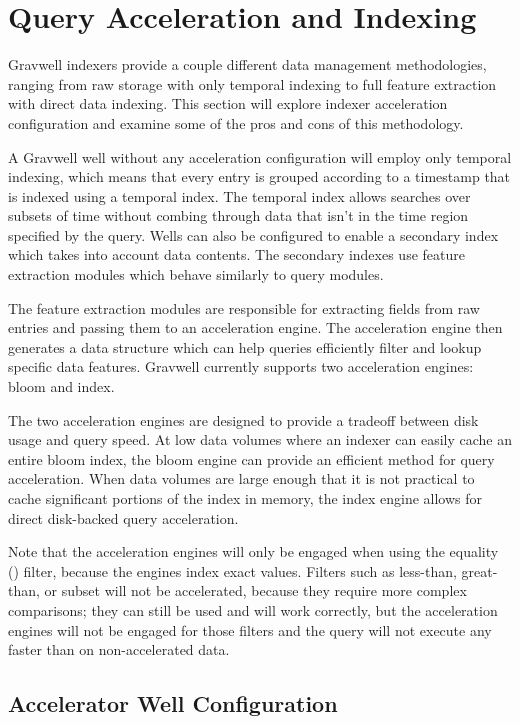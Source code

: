 {\section{Query Acceleration and Indexing}
\label{sec:acceleration}
Gravwell indexers provide a couple different data management
methodologies, ranging from raw storage with only temporal indexing to
full feature extraction with direct data indexing. This section
will explore indexer acceleration configuration and examine some of the
pros and cons of this methodology.

A Gravwell well without any acceleration configuration will employ only
temporal indexing, which means that every entry is grouped according to a
timestamp that is indexed using a temporal index. The temporal index
allows searches over subsets of time without combing through data
that isn't in the time region specified by the query. Wells can also be
configured to enable a secondary index which takes into account data
contents. The secondary indexes use feature extraction modules which
behave similarly to query modules.

The feature extraction modules are responsible for extracting fields
from raw entries and passing them to an acceleration engine. The
acceleration engine then generates a data structure which can help
queries efficiently filter and lookup specific data features. Gravwell
currently supports two acceleration engines: bloom and index.

The two acceleration engines are designed to provide a tradeoff between
disk usage and query speed. At low data volumes where an indexer can
easily cache an entire bloom index, the bloom engine can provide an
efficient method for query acceleration. When data volumes are large
enough that it is not practical to cache significant portions of the
index in memory, the index engine allows for direct disk-backed query
acceleration.

Note that the acceleration engines will only be engaged when using
the equality (\code{==}) filter, because
the engines index exact values. Filters such as less-than, great-than,
or subset will not be accelerated, because they require more complex
comparisons; they can still be used and will work correctly, but the acceleration
engines will not be engaged for those filters and the query will
not execute any faster than on non-accelerated data.

\subsection{Accelerator Well Configuration}

}
